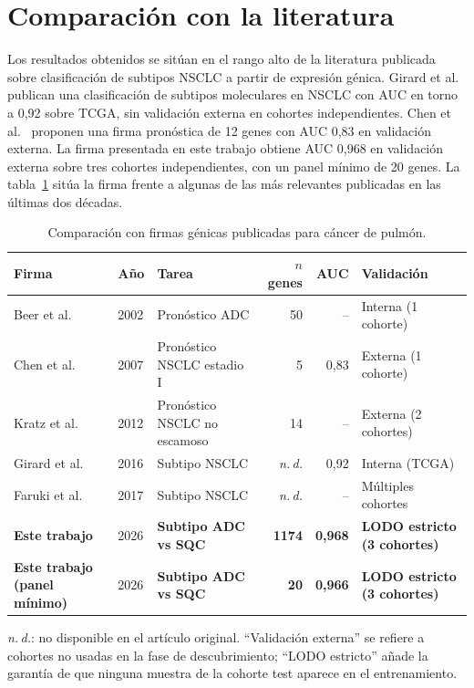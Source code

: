 \section{Comparación con la literatura}
\label{sec:disc_literatura}

Los resultados obtenidos se sitúan en el rango alto de la literatura
publicada sobre clasificación de subtipos NSCLC a partir de expresión
génica. Girard et al.~\cite{girard2016comprehensive} publican una
clasificación de subtipos moleculares en NSCLC con AUC en torno a 0,92
sobre TCGA, sin validación externa en cohortes independientes. Chen et
al.~\cite{chen2017gene} proponen una firma pronóstica de 12 genes con AUC
0,83 en validación externa. La firma presentada en este trabajo obtiene
AUC 0,968 en validación externa sobre tres cohortes independientes, con un
panel mínimo de 20 genes. La tabla~\ref{tab:comparativa} sitúa la firma
frente a algunas de las más relevantes publicadas en las últimas dos
décadas.

\begin{table}[H]
  \centering
  \small
  \caption{Comparación con firmas génicas publicadas para cáncer de
  pulmón.}
  \label{tab:comparativa}
  \begin{tabular}{lllrrl}
    \toprule
    \textbf{Firma} & \textbf{Año} & \textbf{Tarea} & \textbf{$n$ genes} & \textbf{AUC} & \textbf{Validación} \\
    \midrule
    Beer et al.~\cite{beer2002gene}           & 2002 & Pronóstico ADC           & 50   & --    & Interna (1 cohorte) \\
    Chen et al.~\cite{chen2017gene}           & 2007 & Pronóstico NSCLC estadio I & 5    & 0,83  & Externa (1 cohorte) \\
    Kratz et al.~\cite{kratz2012practical}    & 2012 & Pronóstico NSCLC no escamoso & 14  & --    & Externa (2 cohortes) \\
    Girard et al.~\cite{girard2016comprehensive} & 2016 & Subtipo NSCLC           & \emph{n.\,d.} & 0,92 & Interna (TCGA) \\
    Faruki et al.~\cite{faruki2017lung}       & 2017 & Subtipo NSCLC            & \emph{n.\,d.} & --    & Múltiples cohortes \\
    \midrule
    \textbf{Este trabajo}                     & 2026 & \textbf{Subtipo ADC vs SQC} & \textbf{1174} & \textbf{0,968} & \textbf{LODO estricto (3 cohortes)} \\
    \textbf{Este trabajo (panel mínimo)}      & 2026 & \textbf{Subtipo ADC vs SQC} & \textbf{20}   & \textbf{0,966} & \textbf{LODO estricto (3 cohortes)} \\
    \bottomrule
  \end{tabular}

  \vspace{0.35em}
  {\footnotesize \emph{n.\,d.}: no disponible en el artículo original.
  ``Validación externa'' se refiere a cohortes no usadas en la fase de
  descubrimiento; ``LODO estricto'' añade la garantía de que ninguna
  muestra de la cohorte test aparece en el entrenamiento.}
\end{table}

